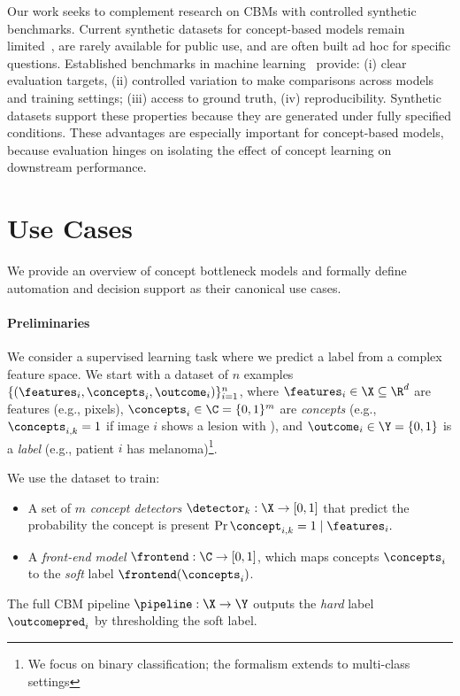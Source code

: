 \documentclass[11pt]{article}
\newcommand{\newsection}[1]{\clearpage\section{#1}}
\newcommand{\newsection}[1]{\section{#1}}
\begin{document}
Our work seeks to complement research on CBMs with controlled synthetic benchmarks. Current synthetic datasets for concept-based models remain limited~\citep[e.g., ][]{pugnana2025deferring, shin2023closer, alukaev2023cross, barbiero2024relational, makonnen2025measuring, parisini2025leakage}, are rarely available for public use, and are often built ad hoc for specific questions. Established benchmarks in machine learning~\citep[see e.g.,][]{johnson2017clevr, ding2021retiring, schwettmann2023find, grinsztajn2022tree, koh2021wilds} provide: (i) clear evaluation targets, (ii) controlled variation to make comparisons across models and training settings; (iii) access to ground truth, (iv) reproducibility.
Synthetic datasets support these properties because they are generated under fully specified conditions. These advantages are especially important for concept-based models, because evaluation hinges on isolating the effect of concept learning on downstream performance.


\newsection{Use Cases}
\label{Sec::Preliminaries}
We provide an overview of concept bottleneck models and formally define automation and decision support as their canonical use cases.

\paragraph{Preliminaries}
We consider a supervised learning task where we predict a label from a complex feature space. We start with a dataset of $n$ examples $\{(\features_i, \concepts_i, \outcome_i)\}_{i=1}^n$, where $\features_{i} \in \X \subseteq \R^d$ are features (e.g., pixels), $\concepts_{i} \in \C = \{0, 1\}^m$ are \emph{concepts} (e.g., $\concepts_{i,k} = 1$ if image $i$ shows a lesion with ), and $\outcome_{i} \in \Y = \{0, 1\}$ is a \emph{label} (e.g., patient $i$ has melanoma)\footnote{We focus on binary classification; the formalism extends to multi-class settings}. 

We use the dataset to train:
%
\begin{itemize}[leftmargin =*]
    \item A set of $m$ \emph{concept detectors} $\detector_k: \X \to [0, 1]$ that predict the probability the concept is present $\Pr{\concept_{i, k} = 1 \mid \features_i}.$ 
    
    \item A \emph{front-end model} $\frontend: \C \to [0,1]$, which maps concepts $\concepts_i$ to the \emph{soft} label $\frontend(\concepts_i)$.
\end{itemize}
%
The full CBM pipeline $\pipeline: \X \to \Y$ outputs the \emph{hard} label $\outcomepred_i$ by thresholding the soft label.
\end{document}
